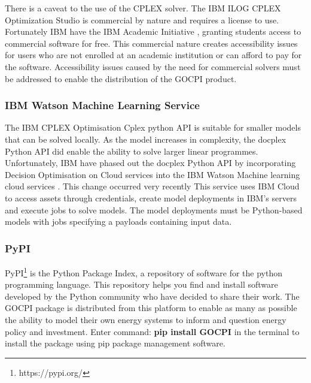 \documentclass[12pt]{article}
\begin{document}
There is a caveat to the use of the CPLEX solver. The IBM ILOG CPLEX Optimization Studio is commercial by nature and requires a license to use.
Fortunately IBM have the IBM Academic Initiative \cite{IBM_AI}, granting students access to commercial software for free.
This commercial nature creates accessibility issues for users who are not enrolled at an academic institution or can afford to pay for the software.
Accessibility issues caused by the need for commercial solvers must be addressed to enable the distribution of the GOCPI product.

\subsubsection{IBM Watson Machine Learning Service}
The IBM CPLEX Optimisation Cplex python API is suitable for smaller models that can be solved locally.
As the model increases in complexity, the docplex Python API did enable the ability to solve larger linear programmes.
Unfortunately, IBM have phased out the docplex Python API by incorporating Decision Optimisation on Cloud services into the IBM Watson Machine learning cloud services \cite{IBM_WML}.
This change occurred very recently
This service uses IBM Cloud to access assets through credentials, create model deployments in IBM's servers and execute jobs to solve models.
The model deployments must be Python-based models with jobs specifying a payloads containing input data.

\subsubsection{PyPI}\label{PyPI}
PyPI\footnote{https://pypi.org/} is the Python Package Index, a repository of software for the python programming language.
This repository helps you find and install software developed by the Python community who have decided to share their work.
The GOCPI package is distributed from this platform to enable as many as possible the ability to model their own energy systems to inform and question energy policy and investment.
Enter command: \textbf{pip install GOCPI} in the terminal to install the package using pip package management software.
\end{document}
